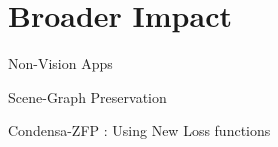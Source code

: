 \section{Broader Impact} 

Non-Vision Apps

Scene-Graph Preservation

Condensa-ZFP : Using New Loss functions

